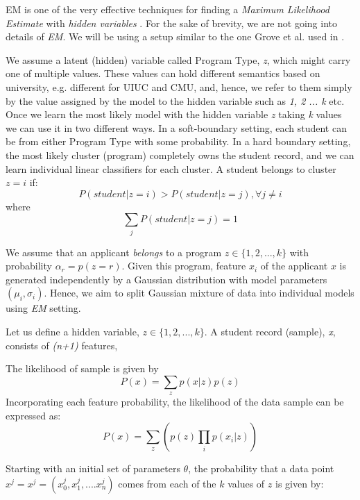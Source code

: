 \documentclass{sig-alternate-05-2015}
\begin{document}
EM is one of the very effective techniques for finding a \textit{Maximum Likelihood Estimate} with \textit{hidden variables} \cite{em-original}. For the sake of brevity, we are not going into details of \textit{EM}. We will be using a setup similar to the one Grove et al. used in \cite{GroveRoth}.

We assume a latent (hidden) variable called Program Type, \textit{z}, which might carry one of multiple values. These values can hold different semantics based on university, e.g. different for UIUC and CMU, and, hence, we refer to them simply by the value assigned by the model to the hidden variable such as \textit{1, 2 ... k} etc. Once we learn the most likely model with the hidden variable \textit{z} taking \textit{k} values we can use it in two different ways. In a soft-boundary setting, each student can be from either Program Type with some probability. In a hard boundary setting, the most likely cluster (program) completely owns the student record, and we can learn individual linear classifiers for each cluster. A student belongs to cluster $z=i$ if:
\begin{equation}P(student | z=i) > P(student | z=j), \forall {j\neq i}\end{equation}
where
\begin{equation}
\sum_j P(student | z=j) = 1
\end{equation}

We assume that an applicant \textit{belongs} to a program $ z \in \{1,2,...,k\} $ with probability $\alpha_r = p(z=r)$. Given this program, feature $x_i$ of the applicant $x$ is generated independently by a Gaussian distribution with model parameters $(\mu_i, \sigma_i)$. Hence, we aim to split Gaussian mixture of data into individual models using \textit{EM} setting.

Let us define a hidden variable, $ z \in \{1,2,...,k\} $. A student record (sample), \textit{x}, consists of \textit{(n+1)} features,

The likelihood of sample is given by
\begin{equation}
P(x) = \sum_z p(x | z) p(z)
\end{equation}
Incorporating each feature probability, the likelihood of the data sample can be expressed as:
\begin{equation}
P(x) = \sum_z \left( p(z) \prod_i p(x_i | z) \right)
\end{equation}

Starting with an initial set of parameters $\theta$, the probability that a data point $x^j = x^j = (x_0^j,x_1^j, ....x_n^j)$ comes from each of the $k$ values of $z$ is given by:
\end{document}
